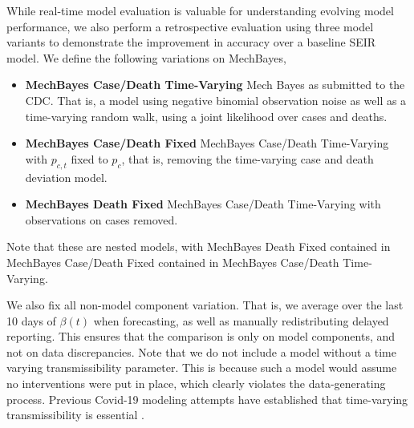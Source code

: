 \documentclass[11pt]{amsart}
\begin{document}
 While real-time model evaluation is valuable for understanding evolving model performance, we also perform a retrospective evaluation using three model variants to demonstrate the improvement in accuracy over a baseline SEIR model. We define the following variations on MechBayes,
 
 \begin{itemize}
 \item \textbf{MechBayes Case/Death Time-Varying} Mech Bayes as submitted to the CDC. That is, a model using negative binomial observation noise as well as a time-varying random walk, using a joint likelihood over cases and deaths.
 
 \item \textbf{MechBayes Case/Death Fixed} MechBayes Case/Death Time-Varying with $p_{c,t}$ fixed to $p_c$, that is, removing the time-varying case and death deviation model.
 
 \item \textbf{MechBayes Death Fixed} MechBayes Case/Death Time-Varying with observations on cases removed.
 \end{itemize}
 
 Note that these are nested models, with MechBayes Death Fixed contained in MechBayes Case/Death Fixed contained in MechBayes Case/Death Time-Varying. 
 
  
 We also fix all non-model component variation. That is, we average over the last 10 days of $\beta(t)$ when forecasting, as well as manually redistributing delayed reporting. This ensures that the comparison is only on model components, and not on data discrepancies. Note that we do not include a model without a time varying transmissibility parameter. This is because such a model would assume no interventions were put in place, which clearly violates the data-generating process. Previous Covid-19 modeling attempts have established that time-varying transmissibility is essential \cite{pei2020differential,abbott2020estimating,flaxman2020estimating,smirnova2019forecasting}.
\end{document}
